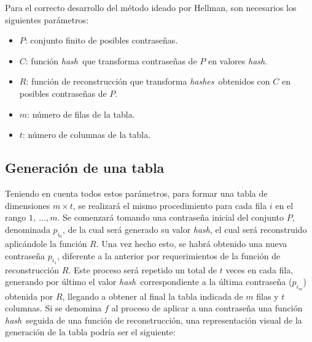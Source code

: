 \documentclass[12pt,spanish,listoffigures,listoftables]{tfgetsinf}
\newcommand{\hash}{\textit{hash}}
\newcommand{\hashes}{\textit{hashes}}
\begin{document}
Para el correcto desarrollo del método ideado por Hellman, son necesarios  los siguientes parámetros:

\begin{itemize}

    \item $P$: conjunto finito de posibles contraseñas.
    
    \item $C$: función \hash~que transforma contraseñas de $P$ en valores \hash.
    
    
    \item $R$: función de reconstrucción que transforma \hashes~obtenidos con $C$ en posibles contraseñas de $P$.
    
    \item $m$: número de filas de la tabla.
    
    \item $t$: número de columnas de la tabla.

\end{itemize}

\subsection{Generación de una tabla}

Teniendo en cuenta todos estos parámetros, para formar una tabla de dimensiones $m \times t$, se realizará el mismo procedimiento para cada fila $i$ en el rango $1,~\dots, m$. Se comenzará tomando una contraseña inicial del conjunto $P$, denominada $p_{i_0}$, de la cual será generado su valor \hash, el cual será reconstruido aplicándole la función $R$. Una vez hecho esto, se habrá obtenido una nueva contraseña $p_{i_1}$, diferente a la anterior por requerimientos de la función de reconstrucción $R$. Este proceso será repetido un total de $t$ veces en cada fila, generando por último el valor \hash~correspondiente a la última contraseña ($p_{i_m}$) obtenida por $R$, llegando a obtener al final la tabla indicada de $m$ filas y $t$ columnas. Si se denomina $f$ al proceso de aplicar a una contraseña una función \hash~seguida de una función de reconstrucción, una representación visual de la generación de la tabla podría ser el siguiente:\\
\end{document}
